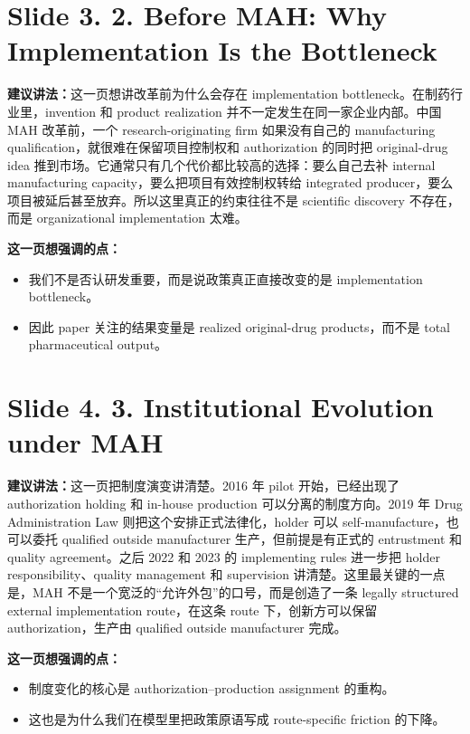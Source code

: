 \documentclass[12pt]{ctexart}
\begin{document}
\newpage
\section*{Slide 3. 2. Before MAH: Why Implementation Is the Bottleneck}
\textbf{建议讲法：}这一页想讲改革前为什么会存在 implementation bottleneck。在制药行业里，invention 和 product realization 并不一定发生在同一家企业内部。中国 MAH 改革前，一个 research-originating firm 如果没有自己的 manufacturing qualification，就很难在保留项目控制权和 authorization 的同时把 original-drug idea 推到市场。它通常只有几个代价都比较高的选择：要么自己去补 internal manufacturing capacity，要么把项目有效控制权转给 integrated producer，要么项目被延后甚至放弃。所以这里真正的约束往往不是 scientific discovery 不存在，而是 organizational implementation 太难。

\vspace{0.5em}
\textbf{这一页想强调的点：}
\begin{itemize}
\item 我们不是否认研发重要，而是说政策真正直接改变的是 implementation bottleneck。
\item 因此 paper 关注的结果变量是 realized original-drug products，而不是 total pharmaceutical output。
\end{itemize}

\newpage
\section*{Slide 4. 3. Institutional Evolution under MAH}
\textbf{建议讲法：}这一页把制度演变讲清楚。2016 年 pilot 开始，已经出现了 authorization holding 和 in-house production 可以分离的制度方向。2019 年 Drug Administration Law 则把这个安排正式法律化，holder 可以 self-manufacture，也可以委托 qualified outside manufacturer 生产，但前提是有正式的 entrustment 和 quality agreement。之后 2022 和 2023 的 implementing rules 进一步把 holder responsibility、quality management 和 supervision 讲清楚。这里最关键的一点是，MAH 不是一个宽泛的“允许外包”的口号，而是创造了一条 legally structured external implementation route，在这条 route 下，创新方可以保留 authorization，生产由 qualified outside manufacturer 完成。

\vspace{0.5em}
\textbf{这一页想强调的点：}
\begin{itemize}
\item 制度变化的核心是 authorization--production assignment 的重构。
\item 这也是为什么我们在模型里把政策原语写成 route-specific friction 的下降。
\end{itemize}
\end{document}
